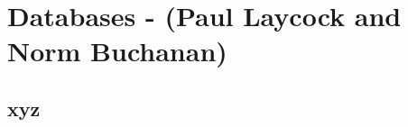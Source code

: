 \chapter{Databases - (Paul Laycock and Norm Buchanan)}
\label{ch:db}

\section{xyz}
\label{sec:db:xyz}  %

